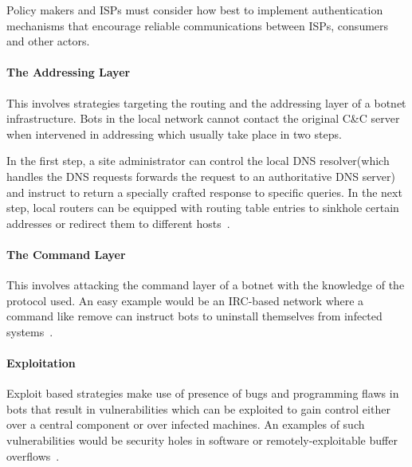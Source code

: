 Policy makers and ISPs must consider how best to implement authentication mechanisms that encourage reliable communications between ISPs, consumers and other actors.
\paragraph{The Addressing Layer}
This involves strategies targeting the routing and the addressing layer of a botnet infrastructure. Bots in the local network cannot contact the original C\&C server when intervened in addressing which usually take place in two steps.


In the first step, a site administrator can control the local DNS resolver(which handles the DNS requests forwards the request to an authoritative DNS server) and instruct to return a specially crafted response to specific queries. In the next step, local routers can be equipped with routing table entries to sinkhole certain addresses or redirect them to different hosts~\cite{leder2009proactive}.


\paragraph{The Command Layer}
This involves attacking the command layer of a botnet with the knowledge of the protocol used. An easy example would be an IRC-based network where a command like remove can instruct bots to uninstall themselves from infected systems~\cite{leder2009proactive}.


\paragraph{Exploitation}
Exploit based strategies make use of presence of bugs and programming flaws in bots that result in vulnerabilities which can be exploited to gain control either over a central component or over infected machines. An examples of such vulnerabilities would be security holes in software or remotely-exploitable buffer overflows~\cite{leder2009proactive}.


